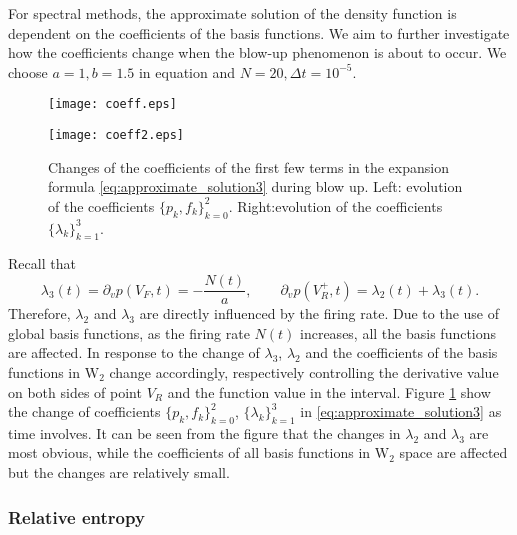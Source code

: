 For spectral methods, the approximate solution of the density function is dependent on the coefficients of the basis functions. We aim to further investigate how the coefficients change when the blow-up phenomenon is about to occur. We choose $a=1, b=1.5$ in equation and $N=20,\Delta t=10^{-5}$.
\begin{figure}[!htb]
    \centering
        \begin{minipage}[c]{0.49\textwidth}
            \centering
            \texttt{[image: coeff.eps]}
        \end{minipage}
        \begin{minipage}[c]{0.49\textwidth}
            \centering
            \texttt{[image: coeff2.eps]}
        \end{minipage}
    \caption{Changes of the coefficients of the first few terms in the expansion formula \eqref{eq:approximate_solution3} during blow up. Left: evolution of the coefficients $\{p_k,f_k\}_{k=0}^2$. Right:evolution of the coefficients $\{\lambda_k\}_{k=1}^3$.  }
    \label{fig:coeff}
\end{figure}


Recall that
\begin{equation}
    \lambda_3(t)=\partial_vp(V_F,t)=-\frac{N(t)}{a},\qquad \partial_vp(V_R^+,t)=\lambda_2(t)+\lambda_3(t).
\end{equation}
Therefore, $\lambda_2$ and $\lambda_3$ are directly influenced by the firing rate. Due to the use of global basis functions, as the firing rate $N(t)$ increases, all the basis functions are affected. In response to the change of $\lambda_3$, $\lambda_2$ and the coefficients of the basis functions in $\mathrm{W}_2$ change accordingly, respectively controlling the derivative value on both sides of point $V_R$ and the function value in the interval. Figure \ref{fig:coeff} show the change of coefficients $\{p_k,f_k\}_{k=0}^2$, $\{\lambda_k\}_{k=1}^3$ in \eqref{eq:approximate_solution3} as time involves. It can be seen from the figure that the changes in $\lambda_2$ and $\lambda_3$ are most obvious, while the coefficients of all basis functions in $\mathrm{W}_2$ space are affected but the changes are relatively small.



\subsubsection{Relative entropy}

